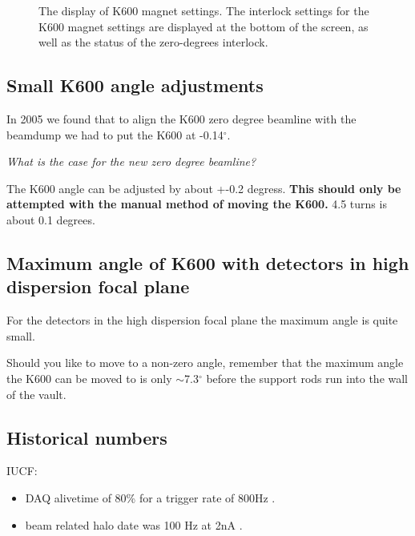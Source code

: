 \documentclass[11pt]{report}
\begin{document}
\begin{figure}[!ht]
\centerline{\vspace{0cm}\hspace{0cm}
}
\centering
\caption{The display of K600 magnet settings. The interlock settings for the K600
magnet settings are displayed at the bottom of the screen, as well as the status
of the zero-degrees interlock.}
\label{fig:magnets-control}
\end{figure} 


\subsection{Small K600 angle adjustments}\label{sec:Small-K600-angle-adjustments}

In 2005 we found that to align the K600 zero degree beamline with the beamdump 
we had to put the K600 at -0.14$^{\circ}$. 

{\it What is the case for the new zero degree beamline?}

The K600 angle can be adjusted by about +-0.2 degress. {\bf This 
should only be attempted with the manual method of moving the K600.}
4.5 turns is about 0.1 degrees.


\subsection{Maximum angle of K600 with detectors in high dispersion focal plane}\label{sec:Max-K600-angle-HDP}
For the detectors in the high dispersion focal plane the maximum angle is quite small.

Should you like to move to a non-zero angle, remember that the maximum angle the
K600 can be moved to is only $\sim$7.3$^{\circ}$ 
before the support rods run into the wall of the vault.



\subsection{Historical numbers}

IUCF:
\begin{itemize}
\item DAQ alivetime of 80\% for a trigger rate of 800Hz \cite{Berg05}.
\item beam related halo date was 100 Hz at 2nA \cite{Berg05}.
\end{itemize}
\end{document}
